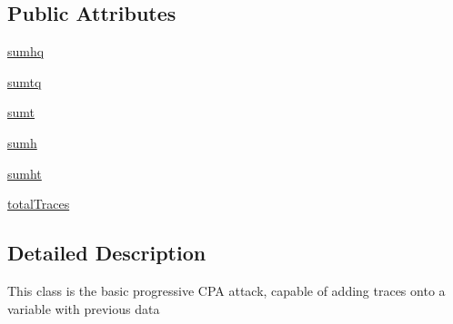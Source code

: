 \subsection*{Public Attributes}
\begin{DoxyCompactItemize}
\item 
\hyperlink{classsoftware_1_1chipwhisperer_1_1analyzer_1_1attacks_1_1cpa__algorithms_1_1experimentalchannelinfo_1_1CPAProgressiveOneSubkey_a7f280e8949b251a91fe7637685f256b0}{sumhq}
\item 
\hyperlink{classsoftware_1_1chipwhisperer_1_1analyzer_1_1attacks_1_1cpa__algorithms_1_1experimentalchannelinfo_1_1CPAProgressiveOneSubkey_ac59fcc51f10d03bcc3f47c516d6c683d}{sumtq}
\item 
\hyperlink{classsoftware_1_1chipwhisperer_1_1analyzer_1_1attacks_1_1cpa__algorithms_1_1experimentalchannelinfo_1_1CPAProgressiveOneSubkey_a4c14a5677ce305927aa6e9f4b45be9ea}{sumt}
\item 
\hyperlink{classsoftware_1_1chipwhisperer_1_1analyzer_1_1attacks_1_1cpa__algorithms_1_1experimentalchannelinfo_1_1CPAProgressiveOneSubkey_a7b626cdb9f5cf746c43291b1d1f0aa4c}{sumh}
\item 
\hyperlink{classsoftware_1_1chipwhisperer_1_1analyzer_1_1attacks_1_1cpa__algorithms_1_1experimentalchannelinfo_1_1CPAProgressiveOneSubkey_a59f4415f854eac5b02940eb3eccc0d84}{sumht}
\item 
\hyperlink{classsoftware_1_1chipwhisperer_1_1analyzer_1_1attacks_1_1cpa__algorithms_1_1experimentalchannelinfo_1_1CPAProgressiveOneSubkey_a1f9a90b97cee6e8624329c0de7c2e292}{total\+Traces}
\end{DoxyCompactItemize}


\subsection{Detailed Description}
\begin{DoxyVerb}This class is the basic progressive CPA attack, capable of adding traces onto a variable with previous data\end{DoxyVerb}
 

